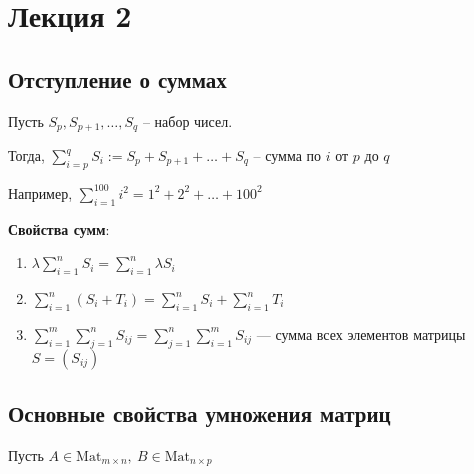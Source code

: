 \section{Лекция 2}

\subsection{Отступление о суммах}

Пусть $S_p, S_{p + 1}, \dots, S_q$ -- набор чисел.

\bigskip
Тогда, $\sum_{i = p}^q S_i := S_p + S_{p + 1} + \dots + S_q $ -- сумма по $i$ от $p$ до $q$

\bigskip
Например, $\sum_{i=1}^{100} i^2 = 1^2 + 2^2 + \dots + 100^2$

\bigskip
\textbf{Свойства сумм}:
\begin{enumerate}
    \item $\lambda \sum_{i=1}^n S_i = \sum_{i=1}^n \lambda S_i $
    \item $\sum_{i=1}^n (S_i + T_i) = \sum_{i=1}^n S_i + \sum^n_{i=1} T_i $
    \item $\sum_{i=1}^m \sum_{j=1}^n S_{ij} = \sum_{j=1}^n \sum_{i=1}^m S_{ij}$ --- сумма всех элементов матрицы $S = (S_{ij})$
\end{enumerate}

\subsection{Основные свойства умножения матриц}

Пусть $A \in \text{Mat}_{m \times n}, \ B \in \text{Mat}_{n \times p}$


